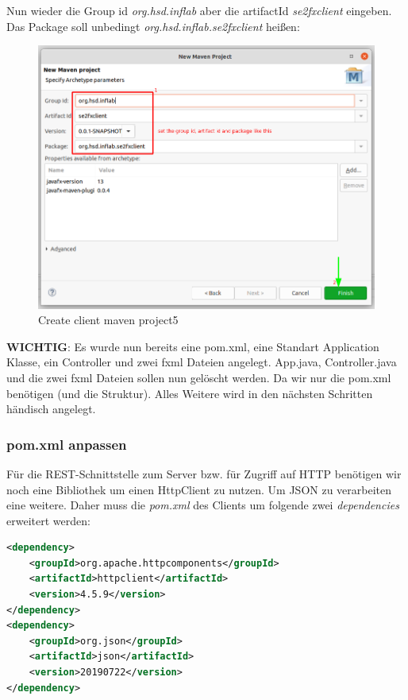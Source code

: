 \documentclass[11pt]{scrartcl}
\begin{document}
\newpage
Nun wieder die Group id \textit{org.hsd.inflab} aber die artifactId
\textit{se2fxclient} eingeben. Das Package soll unbedingt \textit{org.hsd.inflab.se2fxclient}
heißen: \newline
\begin{figure}[!ht]
    \includegraphics[width=\linewidth]{images/eclipse18_client_maven_project5.png}
    \caption{Create client maven project5}
    \label{fig:createclientproject5}
\end{figure}

\textbf{WICHTIG}: Es wurde nun bereits eine pom.xml, eine Standart Application Klasse,
ein Controller und zwei fxml Dateien angelegt. App.java, Controller.java
und die zwei fxml Dateien sollen nun gelöscht werden. Da wir nur die pom.xml benötigen (und die Struktur).
Alles Weitere wird in den nächsten Schritten händisch angelegt.

\newpage
\subsubsection{pom.xml anpassen}
\label{customizepom}
Für die REST-Schnittstelle zum Server bzw. für Zugriff auf HTTP benötigen wir
noch eine Bibliothek um einen HttpClient zu nutzen. Um JSON zu verarbeiten eine weitere.
Daher muss die \textit{pom.xml} des Clients um folgende zwei \textit{dependencies} erweitert
werden:

\begin{lstlisting}[language=XML]
<dependency>
    <groupId>org.apache.httpcomponents</groupId>
    <artifactId>httpclient</artifactId>
    <version>4.5.9</version>
</dependency>
<dependency>
    <groupId>org.json</groupId>
    <artifactId>json</artifactId>
    <version>20190722</version>
</dependency>
\end{lstlisting}
\end{document}

